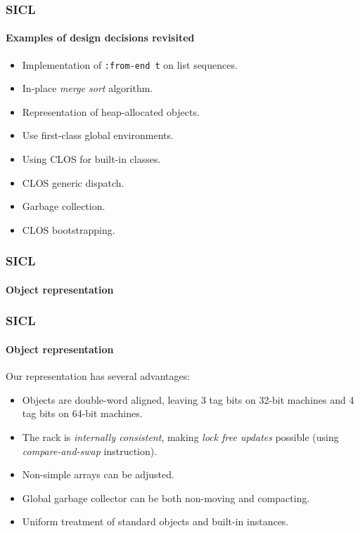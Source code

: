 \documentclass[12pt]{beamer}
\def\inputfig#1{}
\begin{document}
\begin{frame}
  \frametitle{SICL}
  \framesubtitle{Examples of design decisions revisited}

  \begin{itemize}
  \item Implementation of \texttt{:from-end t} on list sequences.
  \item In-place \emph{merge sort} algorithm. 
  \item Representation of heap-allocated objects.
  \item Use first-class global environments.
  \item Using CLOS for built-in classes.
  \item CLOS generic dispatch.
  \item Garbage collection.
  \item CLOS bootstrapping.
  \end{itemize}
\end{frame}
\begin{frame}
  \frametitle{SICL}
  \framesubtitle{Object representation}
  \begin{center}
\inputfig{fig-representation.pdf_t}
  \end{center}

\end{frame}
\begin{frame}
  \frametitle{SICL}
  \framesubtitle{Object representation}

  Our representation has several advantages:

  \begin{itemize}
  \item Objects are double-word aligned, leaving 3 tag bits on 32-bit
    machines and 4 tag bits on 64-bit machines.  
  \item The rack is \emph{internally consistent}, making \emph{lock
    free updates} possible (using \emph{compare-and-swap}
    instruction).
  \item Non-simple arrays can be adjusted. 
  \item Global garbage collector can be both non-moving and
    compacting.
  \item Uniform treatment of standard objects and built-in instances. 
  \end{itemize}

\end{frame}
\end{document}
